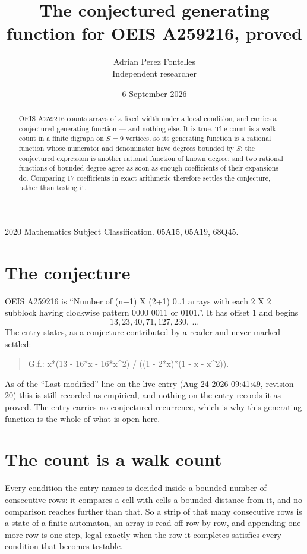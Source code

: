 \documentclass[11pt,a4paper]{article}
\title{The conjectured generating function for OEIS A259216, proved}
\author{Adrian Perez Fontelles\\ \small Independent researcher}
\date{6 September 2026}
\theoremstyle{plain}
\theoremstyle{definition}
\begin{document}
\maketitle

\begin{abstract}
OEIS A259216 counts arrays of a fixed width under a local condition, and carries a conjectured
generating function --- and nothing else. It is true. The count is a walk count in a finite
digraph on $S=9$ vertices, so its generating function is a rational function whose numerator
and denominator have degrees bounded by $S$; the conjectured expression is another rational
function of known degree; and two rational functions of bounded degree agree as soon as enough
coefficients of their expansions do. Comparing $17$ coefficients in exact arithmetic
therefore settles the conjecture, rather than testing it.
\end{abstract}

\noindent\small 2020 Mathematics Subject Classification. 05A15, 05A19, 68Q45.\normalsize

\section{The conjecture}

OEIS A259216 is ``Number of (n+1) X (2+1) 0..1 arrays with each 2 X 2 subblock having clockwise pattern 0000 0011 or 0101.''. It has offset $1$ and begins
\[
13, 23, 40, 71, 127, 230,\ \dots
\]
The entry states, as a conjecture contributed by a reader and never marked settled:
\begin{quote}
G.f.: x*(13 - 16*x - 16*x\^{}2) / ((1 - 2*x)*(1 - x - x\^{}2)).
\end{quote}
As of the ``Last modified'' line on the live entry (Aug 24 2026 09:41:49, revision 20) this is still
recorded as empirical, and nothing on the entry records it as proved. The entry carries no
conjectured recurrence, which is why this generating function is the whole of what is open
here.

\section{The count is a walk count}

Every condition the entry names is decided inside a bounded number of consecutive rows: it
compares a cell with cells a bounded distance from it, and no comparison reaches further than
that. So a strip of that many consecutive rows is a state of a finite automaton, an array is
read off row by row, and appending one more row is one step, legal exactly when the row it
completes satisfies every condition that becomes testable.
\end{document}
